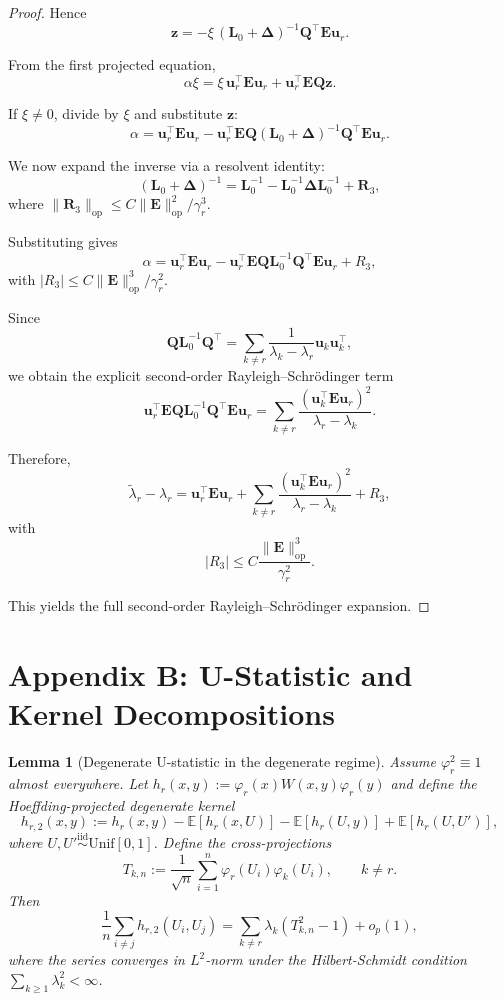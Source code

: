 \documentclass[11pt]{article}
\theoremstyle{plain}
\newtheorem{lemma}[theorem]{Lemma}
\theoremstyle{remark}
\newcommand{\op}{\mathrm{op}}
\begin{document}
\begin{proof}
Hence
\[
\mathbf{z}
=
-\xi\,(\mathbf{L}_0+\mathbf{\Delta})^{-1}
\mathbf{Q}^\top\mathbf{E}\mathbf{u}_r.
\]

From the first projected equation,
\[
\alpha\xi
=
\xi\,\mathbf{u}_r^\top\mathbf{E}\mathbf{u}_r
+
\mathbf{u}_r^\top\mathbf{E}\mathbf{Q}\mathbf{z}.
\]

If $\xi\neq0$, divide by $\xi$ and substitute $\mathbf{z}$:
\[
\alpha
=
\mathbf{u}_r^\top\mathbf{E}\mathbf{u}_r
-
\mathbf{u}_r^\top\mathbf{E}\mathbf{Q}
(\mathbf{L}_0+\mathbf{\Delta})^{-1}
\mathbf{Q}^\top\mathbf{E}\mathbf{u}_r.
\]

We now expand the inverse via a resolvent identity:
\[
(\mathbf{L}_0+\mathbf{\Delta})^{-1}
=
\mathbf{L}_0^{-1}
-
\mathbf{L}_0^{-1}\mathbf{\Delta}\mathbf{L}_0^{-1}
+
\mathbf{R}_3,
\]
where
\(
\|\mathbf{R}_3\|_{\op}
\le C \|\mathbf{E}\|_{\op}^2/\gamma_r^3.
\)

Substituting gives
\[
\alpha
=
\mathbf{u}_r^\top\mathbf{E}\mathbf{u}_r
-
\mathbf{u}_r^\top\mathbf{E}\mathbf{Q}
\mathbf{L}_0^{-1}
\mathbf{Q}^\top\mathbf{E}\mathbf{u}_r
+
R_3,
\]
with
\(
|R_3|
\le C\|\mathbf{E}\|_{\op}^3/\gamma_r^2.
\)

Since
\[
\mathbf{Q}\mathbf{L}_0^{-1}\mathbf{Q}^\top
=
\sum_{k\ne r}
\frac{1}{\lambda_k-\lambda_r}
\mathbf{u}_k\mathbf{u}_k^\top,
\]
we obtain the explicit second-order Rayleigh–Schrödinger term
\[
\mathbf{u}_r^\top\mathbf{E}\mathbf{Q}
\mathbf{L}_0^{-1}
\mathbf{Q}^\top\mathbf{E}\mathbf{u}_r
=
\sum_{k\ne r}
\frac{(\mathbf{u}_k^\top\mathbf{E}\mathbf{u}_r)^2}
{\lambda_r-\lambda_k}.
\]

Therefore,
\[
\widetilde{\lambda}_r-\lambda_r
=
\mathbf{u}_r^\top\mathbf{E}\mathbf{u}_r
+
\sum_{k\ne r}
\frac{(\mathbf{u}_k^\top\mathbf{E}\mathbf{u}_r)^2}
{\lambda_r-\lambda_k}
+
R_3,
\]
with
\[
|R_3|
\le
C\frac{\|\mathbf{E}\|_{\op}^3}{\gamma_r^2}.
\]

This yields the full second-order Rayleigh–Schrödinger expansion.
\end{proof}

\section*{Appendix B: U-Statistic and Kernel Decompositions} \setcounter{section}{2} \renewcommand{\thesection}{B.\arabic{section}} \renewcommand{\thelemma}{B.\arabic{lemma}}

\begin{lemma}[Degenerate U-statistic in the degenerate regime]\label{lem:degU}
Assume $\varphi_r^2 \equiv 1$ almost everywhere. Let $h_r(x,y) := \varphi_r(x)W(x,y)\varphi_r(y)$ and define the Hoeffding-projected degenerate kernel
\[
h_{r,2}(x,y) := h_r(x,y) - \mathbb{E}[h_r(x,U)] - \mathbb{E}[h_r(U,y)] + \mathbb{E}[h_r(U,U')],
\]
where $U, U' \stackrel{\text{iid}}{\sim} \text{Unif}[0,1]$. Define the cross-projections
\[
T_{k,n} := \frac{1}{\sqrt{n}}\sum_{i=1}^n \varphi_r(U_i)\varphi_k(U_i), \qquad k \neq r.
\]
Then
\[
\frac{1}{n}\sum_{i \neq j}h_{r,2}(U_i,U_j)
=
\sum_{k \neq r}\lambda_k\left(T_{k,n}^2 - 1\right) + o_p(1),
\]
where the series converges in $L^2$-norm under the Hilbert-Schmidt condition $\sum_{k \ge 1}\lambda_k^2 < \infty$.
\end{lemma}
\end{document}

